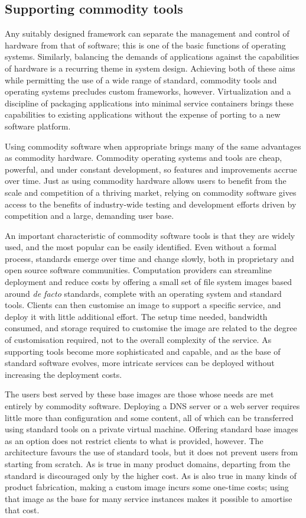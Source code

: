 \subsection{Supporting commodity tools}

Any suitably designed framework can separate the management and control of hardware from that of software; this is one of the basic functions of operating systems. Similarly, balancing the demands of applications against the capabilities of hardware is a recurring theme in system design. Achieving both of these aims while permitting the use of a wide range of standard, commodity tools and operating systems precludes custom frameworks, however. Virtualization and a discipline of packaging applications into minimal service containers brings these capabilities to existing applications without the expense of porting to a new software platform.

Using commodity software when appropriate brings many of the same advantages as commodity hardware. Commodity operating systems and tools are cheap, powerful, and under constant development, so features and improvements accrue over time. Just as using commodity hardware allows users to benefit from the scale and competition of a thriving market, relying on commodity software gives access to the benefits of industry-wide testing and development efforts driven by competition and a large, demanding user base.

An important characteristic of commodity software tools is that they are widely used, and the most popular can be easily identified. Even without a formal process, standards emerge over time and change slowly, both in proprietary and open source software communities. Computation providers can streamline deployment and reduce costs by offering a small set of file system images based around \emph{de facto} standards, complete with an operating system and standard tools. Clients can then customise an image to support a specific service, and deploy it with little additional effort. The setup time needed, bandwidth consumed, and storage required to customise the image are related to the degree of customisation required, not to the overall complexity of the service. As supporting tools become more sophisticated and capable, and as the base of standard software evolves, more intricate services can be deployed without increasing the deployment costs.

The users best served by these base images are those whose needs are met entirely by commodity software. Deploying a DNS server or a web server requires little more than configuration and some content, all of which can be transferred using standard tools on a private virtual machine. Offering standard base images as an option does not restrict clients to what is provided, however. The architecture favours the use of standard tools, but it does not prevent users from starting from scratch. As is true in many product domains, departing from the standard is discouraged only by the higher cost. As is also true in many kinds of product fabrication, making a custom image incurs some one-time costs; using that image as the base for many service instances makes it possible to amortise that cost.


